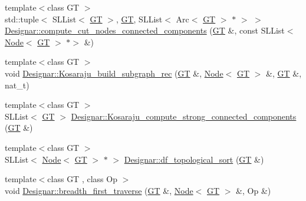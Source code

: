 \begin{DoxyCompactItemize}
\item 
{\footnotesize template$<$class GT $>$ }\\std\+::tuple$<$ S\+L\+List$<$ \hyperlink{demo-buildgraph_8_c_a3001c40d2c31ca87ed96cd7d1334a55e}{GT} $>$, \hyperlink{demo-buildgraph_8_c_a3001c40d2c31ca87ed96cd7d1334a55e}{GT}, S\+L\+List$<$ Arc$<$ \hyperlink{demo-buildgraph_8_c_a3001c40d2c31ca87ed96cd7d1334a55e}{GT} $>$ $\ast$ $>$ $>$ \hyperlink{namespace_designar_a52ce1bee324d17e8876db18c45deabd9}{Designar\+::compute\+\_\+cut\+\_\+nodes\+\_\+connected\+\_\+components} (\hyperlink{demo-buildgraph_8_c_a3001c40d2c31ca87ed96cd7d1334a55e}{GT} \&, const S\+L\+List$<$ \hyperlink{test-mtreenode_8_c_a17a24b0725f59987143c5faf63c4dc6f}{Node}$<$ \hyperlink{demo-buildgraph_8_c_a3001c40d2c31ca87ed96cd7d1334a55e}{GT} $>$ $\ast$$>$ \&)
\item 
{\footnotesize template$<$class GT $>$ }\\void \hyperlink{namespace_designar_a939778d2922bd8f97f08c5297c8d7f5e}{Designar\+::\+Kosaraju\+\_\+build\+\_\+subgraph\+\_\+rec} (\hyperlink{demo-buildgraph_8_c_a3001c40d2c31ca87ed96cd7d1334a55e}{GT} \&, \hyperlink{test-mtreenode_8_c_a17a24b0725f59987143c5faf63c4dc6f}{Node}$<$ \hyperlink{demo-buildgraph_8_c_a3001c40d2c31ca87ed96cd7d1334a55e}{GT} $>$ \&, \hyperlink{demo-buildgraph_8_c_a3001c40d2c31ca87ed96cd7d1334a55e}{GT} \&, nat\+\_\+t)
\item 
{\footnotesize template$<$class GT $>$ }\\S\+L\+List$<$ \hyperlink{demo-buildgraph_8_c_a3001c40d2c31ca87ed96cd7d1334a55e}{GT} $>$ \hyperlink{namespace_designar_a53b8f28f7265931cb9a0d2ef95fec0d1}{Designar\+::\+Kosaraju\+\_\+compute\+\_\+strong\+\_\+connected\+\_\+components} (\hyperlink{demo-buildgraph_8_c_a3001c40d2c31ca87ed96cd7d1334a55e}{GT} \&)
\item 
{\footnotesize template$<$class GT $>$ }\\S\+L\+List$<$ \hyperlink{test-mtreenode_8_c_a17a24b0725f59987143c5faf63c4dc6f}{Node}$<$ \hyperlink{demo-buildgraph_8_c_a3001c40d2c31ca87ed96cd7d1334a55e}{GT} $>$ $\ast$ $>$ \hyperlink{namespace_designar_aea55a662f6563f40a64509015ca3ab10}{Designar\+::df\+\_\+topological\+\_\+sort} (\hyperlink{demo-buildgraph_8_c_a3001c40d2c31ca87ed96cd7d1334a55e}{GT} \&)
\item 
{\footnotesize template$<$class GT , class Op $>$ }\\void \hyperlink{namespace_designar_a676f3fbced360c84028f69998e74bede}{Designar\+::breadth\+\_\+first\+\_\+traverse} (\hyperlink{demo-buildgraph_8_c_a3001c40d2c31ca87ed96cd7d1334a55e}{GT} \&, \hyperlink{test-mtreenode_8_c_a17a24b0725f59987143c5faf63c4dc6f}{Node}$<$ \hyperlink{demo-buildgraph_8_c_a3001c40d2c31ca87ed96cd7d1334a55e}{GT} $>$ \&, Op \&)
$$
\end{DoxyCompactItemize}
